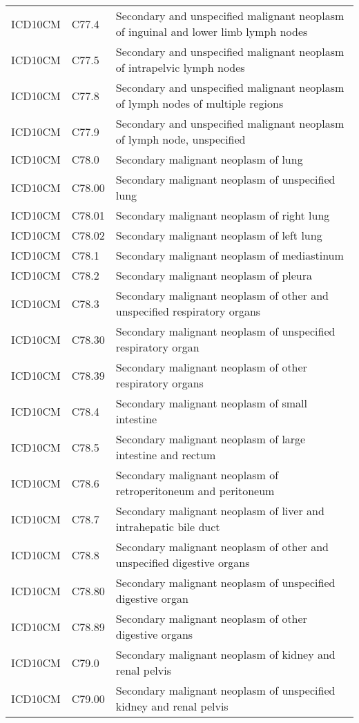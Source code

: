 \begin{longtable}{p{}p{}p{}}
  ICD10CM & C77.4 & Secondary and unspecified malignant neoplasm of inguinal and lower limb lymph nodes \\ 
  ICD10CM & C77.5 & Secondary and unspecified malignant neoplasm of intrapelvic lymph nodes \\ 
  ICD10CM & C77.8 & Secondary and unspecified malignant neoplasm of lymph nodes of multiple regions \\ 
  ICD10CM & C77.9 & Secondary and unspecified malignant neoplasm of lymph node, unspecified \\ 
  ICD10CM & C78.0 & Secondary malignant neoplasm of lung \\ 
  ICD10CM & C78.00 & Secondary malignant neoplasm of unspecified lung \\ 
  ICD10CM & C78.01 & Secondary malignant neoplasm of right lung \\ 
  ICD10CM & C78.02 & Secondary malignant neoplasm of left lung \\ 
  ICD10CM & C78.1 & Secondary malignant neoplasm of mediastinum \\ 
  ICD10CM & C78.2 & Secondary malignant neoplasm of pleura \\ 
  ICD10CM & C78.3 & Secondary malignant neoplasm of other and unspecified respiratory organs \\ 
  ICD10CM & C78.30 & Secondary malignant neoplasm of unspecified respiratory organ \\ 
  ICD10CM & C78.39 & Secondary malignant neoplasm of other respiratory organs \\ 
  ICD10CM & C78.4 & Secondary malignant neoplasm of small intestine \\ 
  ICD10CM & C78.5 & Secondary malignant neoplasm of large intestine and rectum \\ 
  ICD10CM & C78.6 & Secondary malignant neoplasm of retroperitoneum and peritoneum \\ 
  ICD10CM & C78.7 & Secondary malignant neoplasm of liver and intrahepatic bile duct \\ 
  ICD10CM & C78.8 & Secondary malignant neoplasm of other and unspecified digestive organs \\ 
  ICD10CM & C78.80 & Secondary malignant neoplasm of unspecified digestive organ \\ 
  ICD10CM & C78.89 & Secondary malignant neoplasm of other digestive organs \\ 
  ICD10CM & C79.0 & Secondary malignant neoplasm of kidney and renal pelvis \\ 
  ICD10CM & C79.00 & Secondary malignant neoplasm of unspecified kidney and renal pelvis \\ 

\end{longtable}
